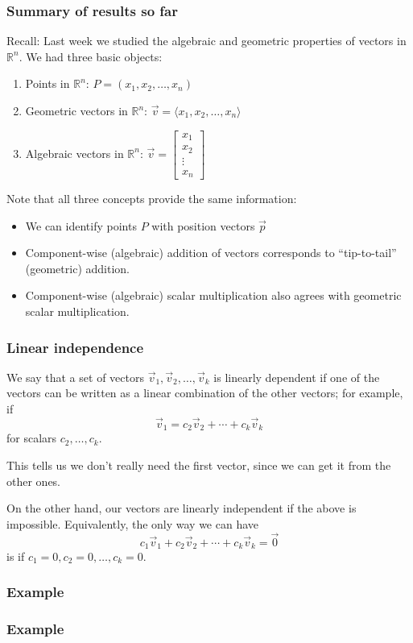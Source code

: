 \documentclass[11pt,t]{beamer}
\newcommand{\R}{\mathbb{R}}
\begin{document}
\begin{frame}
\frametitle{Summary of results so far}

\alert{Recall}: Last week we studied the algebraic and geometric properties of vectors in $\mathbb{R}^n$. We had three basic objects:
\begin{enumerate}
\item \alert{Points} in $\R^n$: $P = (x_1,x_2,\ldots, x_n)$
\item \alert{Geometric vectors} in $\R^n$: $\vec{v} = \langle x_1,x_2,\ldots, x_n\rangle$
\item \alert{Algebraic vectors} in $\R^n$: $\vec{v} = \begin{bmatrix}
x_1\\x_2\\\vdots\\x_n
\end{bmatrix}$
\end{enumerate}
Note that all three concepts provide the \alert{same information}:
\begin{itemize}
\item We can identify points $P$ with position vectors $\vec{p}$
\item Component-wise (algebraic) addition of vectors corresponds to ``tip-to-tail'' (geometric) addition.
\item Component-wise (algebraic) scalar multiplication also agrees with geometric scalar multiplication.
\end{itemize}
\end{frame}
\begin{frame}\frametitle{Linear independence}
 We say that a set of vectors $\vec{v}_1,\vec{v}_2,\ldots, \vec{v}_k$ is \alert{linearly dependent} if one of the vectors can be written as a linear combination of the other vectors; for example, if
\[
 \vec{v}_1 = c_2\vec{v}_2+\cdots+c_k\vec{v}_k
\]
for scalars $c_2,\ldots, c_k$.

 This tells us we don't really need the first vector, since we can get it from the other ones.

 On the other hand, our vectors are \alert{linearly independent} if the above is impossible. Equivalently, the only way we can have
\[
 c_1\vec{v}_1+c_2\vec{v}_2+\cdots + c_k\vec{v}_k=\vec{0}
\]
is if $c_1=0, c_2=0,\ldots, c_k=0$.
\end{frame}
\begin{frame}\frametitle{Example}
 
\end{frame}
\begin{frame}\frametitle{Example}
 
\end{frame}
\end{document}
